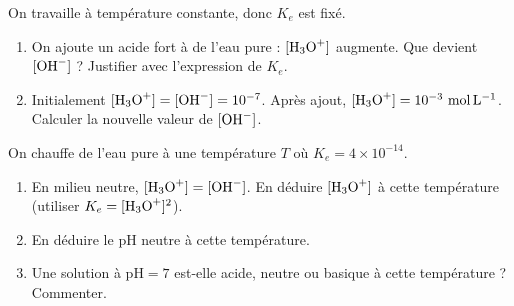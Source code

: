 \documentclass[11pt,a4paper]{article}
\begin{document}
\begin{exobox}
On travaille à température constante, donc $K_e$ est fixé.
\begin{enumerate}[label=\alph*),leftmargin=1.6em,itemsep=2pt]
  \item On ajoute un acide fort à de l'eau pure : $[\ce{H3O+}]$ augmente. Que devient $[\ce{OH-}]$ ?
        Justifier avec l'expression de $K_e$.
  \item Initialement $[\ce{H3O+}]=[\ce{OH-}]=10^{-7}$. Après ajout, $[\ce{H3O+}]=10^{-3}\ \si{mol.L^{-1}}$.
        Calculer la nouvelle valeur de $[\ce{OH-}]$.
\end{enumerate}
\end{exobox}

\begin{exobox}
On chauffe de l'eau pure à une température $T$ où $K_e = 4\times10^{-14}$.
\begin{enumerate}[label=\alph*),leftmargin=1.6em,itemsep=2pt]
  \item En milieu neutre, $[\ce{H3O+}]=[\ce{OH-}]$. En déduire $[\ce{H3O+}]$ à cette température (utiliser
        $K_e=[\ce{H3O+}]^2$).
  \item En déduire le $\mathrm{pH}$ neutre à cette température.
  \item Une solution à $\mathrm{pH}=7$ est-elle acide, neutre ou basique à cette température ? Commenter.
\end{enumerate}
\end{exobox}
\end{document}
